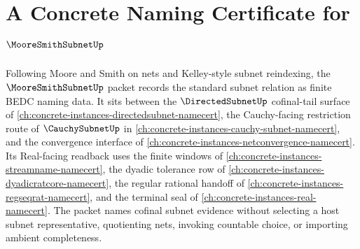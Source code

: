 \chapter{A Concrete Naming Certificate for $\MooreSmithSubnetUp$}
\label{ch:concrete-instances-moore-smith-subnet-namecert}

Following Moore and Smith on nets and Kelley-style subnet reindexing, the $\MooreSmithSubnetUp$ packet records the standard subnet relation as finite BEDC naming data. It sits between the $\DirectedSubnetUp$ cofinal-tail surface of \autoref{ch:concrete-instances-directedsubnet-namecert}, the Cauchy-facing restriction route of $\CauchySubnetUp$ in \autoref{ch:concrete-instances-cauchy-subnet-namecert}, and the convergence interface of \autoref{ch:concrete-instances-netconvergence-namecert}. Its Real-facing readback uses the finite windows of \autoref{ch:concrete-instances-streamname-namecert}, the dyadic tolerance row of \autoref{ch:concrete-instances-dyadicratcore-namecert}, the regular rational handoff of \autoref{ch:concrete-instances-regseqrat-namecert}, and the terminal seal of \autoref{ch:concrete-instances-real-namecert}. The packet names cofinal subnet evidence without selecting a host subnet representative, quotienting nets, invoking countable choice, or importing ambient completeness.

